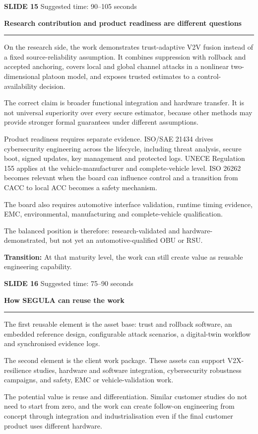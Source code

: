 \documentclass[11pt,a4paper]{article}
\newcommand{\slidetitle}[3]{%
  \clearpage
  {\color{BrandCyan}\large\bfseries SLIDE #1}\hfill
  {\color{Muted}\small Suggested time: #3}\par
  \vspace{0.18cm}
  {\color{BrandBlue}\LARGE\bfseries #2}\par
  \vspace{0.20cm}
  {\color{BrandMagenta}\rule{1.1cm}{1.2pt}}\par
  \vspace{0.12cm}
}
\newcommand{\transition}[1]{%
  \vfill
  \colorbox{Panel}{%
    \parbox{\dimexpr\textwidth-2\fboxsep\relax}{%
      \raggedright\textbf{Transition:} #1}}
}
\begin{document}
\slidetitle{15}{Research contribution and product readiness are different questions}{90--105 seconds}

On the research side, the work demonstrates trust-adaptive V2V fusion instead of a fixed source-reliability assumption. It combines suppression with rollback and accepted anchoring, covers local and global channel attacks in a nonlinear two-dimensional platoon model, and exposes trusted estimates to a control-availability decision.

The correct claim is broader functional integration and hardware transfer. It is not universal superiority over every secure estimator, because other methods may provide stronger formal guarantees under different assumptions.

Product readiness requires separate evidence. ISO/SAE 21434 drives cybersecurity engineering across the lifecycle, including threat analysis, secure boot, signed updates, key management and protected logs. UNECE Regulation 155 applies at the vehicle-manufacturer and complete-vehicle level. ISO 26262 becomes relevant when the board can influence control and a transition from CACC to local ACC becomes a safety mechanism.

The board also requires automotive interface validation, runtime timing evidence, EMC, environmental, manufacturing and complete-vehicle qualification.

The balanced position is therefore: research-validated and hardware-demonstrated, but not yet an automotive-qualified OBU or RSU.

\transition{At that maturity level, the work can still create value as reusable engineering capability.}

\slidetitle{16}{How SEGULA can reuse the work}{75--90 seconds}

The first reusable element is the asset base: trust and rollback software, an embedded reference design, configurable attack scenarios, a digital-twin workflow and synchronised evidence logs.

The second element is the client work package. These assets can support V2X-resilience studies, hardware and software integration, cybersecurity robustness campaigns, and safety, EMC or vehicle-validation work.

The potential value is reuse and differentiation. Similar customer studies do not need to start from zero, and the work can create follow-on engineering from concept through integration and industrialisation even if the final customer product uses different hardware.
\end{document}
